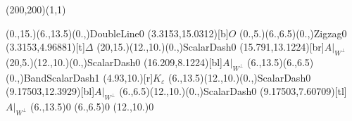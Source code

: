 \unitlength=1bp%

\begin{feynartspicture}(200,200)(1,1)

\FADiagram{}
\FAProp(0.,15.)(6.,13.5)(0.,){DoubleLine}{0}
\FALabel(3.3153,15.0312)[b]{$O$}
\FAProp(0.,5.)(6.,6.5)(0.,){Zigzag}{0}
\FALabel(3.3153,4.96881)[t]{$\Delta$}
\FAProp(20,15.)(12.,10.)(0.,){ScalarDash}{0}
\FALabel(15.791,13.1224)[br]{$A|_{W^\perp}$}
\FAProp(20,5.)(12.,10.)(0.,){ScalarDash}{0}
\FALabel(16.209,8.1224)[bl]{$A|_{W^\perp}$}
\FAProp(6.,13.5)(6.,6.5)(0.,){BandScalarDash}{1}
\FALabel(4.93,10.)[r]{$K_\varepsilon$}
\FAProp(6.,13.5)(12.,10.)(0.,){ScalarDash}{0}
\FALabel(9.17503,12.3929)[bl]{$A|_{W^\perp}$}
\FAProp(6.,6.5)(12.,10.)(0.,){ScalarDash}{0}
\FALabel(9.17503,7.60709)[tl]{$A|_{W^\perp}$}
\FAVert(6.,13.5){0}
\FAVert(6.,6.5){0}
\FAVert(12.,10.){0}
\end{feynartspicture}

